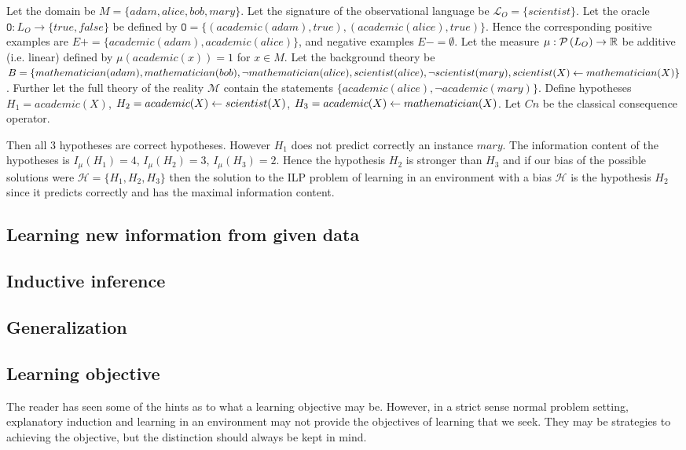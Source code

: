 \begin{exmp}
Let the domain be $M=\{adam, alice, bob, mary\}$.
Let the signature of the observational language be $\mathcal{L}_O=\{scientist\}$.
Let the oracle $\mathtt{O}:L_O \to \{true, false\}$ be defined by $\mathtt{O}=\{(academic(adam),true), (academic(alice), true)\}$.
Hence the corresponding positive examples are
$E+=\{academic(adam), academic(alice)\}$, and negative examples $E-=\emptyset$.
Let the measure $\mu:\mathcal{P} \left({ L_O }\right) \to \mathbb{R}$ be additive (i.e. linear) defined by $\mu(academic(x))=1$ for $x \in M$.
Let the background theory be $B=\{mathematician(adam), mathematician(bob),
\neg mathematician(alice), scientist(alice),\\
\neg scientist(mary),
scientist(X) \leftarrow mathematician(X)
\}$.
Further let the full theory of the reality $\mathcal{M}$ contain the statements
$\{academic(alice), \neg academic(mary) \}$.
Define hypotheses
$H_1=academic(X)$,
$H_2=academic(X) \leftarrow scientist(X)$,
$H_3=academic(X) \leftarrow mathematician(X)$.
Let $Cn$ be the classical consequence operator.

Then all 3 hypotheses are correct hypotheses. However $H_1$ does not predict correctly an instance $mary$. The information content of the hypotheses is
$I_\mu(H_1)=4$, $I_\mu(H_2)=3$, $I_\mu(H_3)=2$. Hence the hypothesis $H_2$ is stronger than $H_3$ and if our bias of the possible solutions were $\mathcal{H}=\{H_1, H_2, H_3\}$ then the solution to the ILP problem of learning in an environment with a bias $\mathcal{H}$ is the hypothesis $H_2$ since it predicts correctly and has the maximal information content.
\end{exmp}

\subsection{Learning new information from given data}
\subsection{Inductive inference}

\subsection{Generalization}

\subsection{Learning objective}
The reader has seen some of the hints as to what a learning objective may be. However, in a strict sense normal problem setting, explanatory induction and learning in an environment may not provide the objectives of learning that we seek. They may be strategies to achieving the objective, but the distinction should always be kept in mind.



